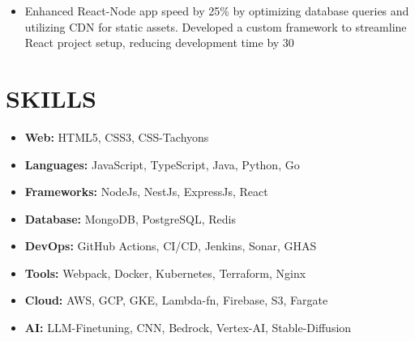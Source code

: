 \documentclass[line, margin, 12pt]{res}
\begin{document}
\begin{resume}
\begin{itemize}
\item Enhanced React-Node app speed by 25\% by optimizing database queries and utilizing CDN for static assets. Developed a custom framework to streamline React project setup, reducing development time by 30%
\end{itemize}


\section{SKILLS}
\begin{itemize}
\item \textbf{Web:} HTML5, CSS3, CSS-Tachyons
\item \textbf{Languages:} JavaScript, TypeScript, Java, Python, Go
\item \textbf{Frameworks:} NodeJs, NestJs, ExpressJs, React
\item \textbf{Database:} MongoDB, PostgreSQL, Redis
\item \textbf{DevOps:} GitHub Actions, CI/CD, Jenkins, Sonar, GHAS
\item \textbf{Tools:} Webpack, Docker, Kubernetes, Terraform, Nginx
\item \textbf{Cloud:} AWS, GCP, GKE, Lambda-fn, Firebase, S3, Fargate
\item \textbf{AI:} LLM-Finetuning, CNN, Bedrock, Vertex-AI, Stable-Diffusion
\end{itemize}

\end{resume}
\end{document}
